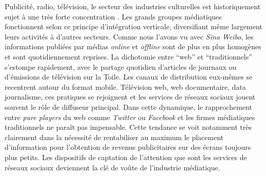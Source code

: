 Publicité, radio, télévision, le secteur des industries culturelles est historiquement sujet à une très forte concentration \citep{Martel2010}. Les grands groupes médiatiques fonctionnent selon ce principe d'intégration verticale, diversifiant même largement leurs activités à d'autres secteurs. Comme nous l'avons vu avec \textit{Sina Weibo}, les informations publiées par médias \textit{online} et \textit{offline} sont de plus en plus homogènes et sont quotidiennement reprises. La dichotomie entre ``web'' et ``traditionnels'' s'estompe rapidement, avec le partage quotidien d'articles de journaux ou d'émissions de télévision sur la Toile. Les canaux de distribution eux-mêmes se recentrent autour du format mobile. Télévision web,  web documentaire, data journalisme, ces pratiques se rejoignent et les services de réseaux sociaux jouent souvent le rôle de diffuseur principal. Dans cette dynamique, le rapprochement entre \textit{pure players} du web comme \textit{Twitter} ou \textit{Facebook} et les firmes médiatiques traditionnels ne paraît pas impensable. Cette tendance se voit notamment très clairement dans la nécessité de rentabiliser au maximum le placement d'information pour l'obtention de revenus publicitaires sur des écrans toujours plus petits. Les dispositifs de captation de l'attention que sont les services de réseaux sociaux deviennent la clé de voûte de l'industrie médiatique. 

